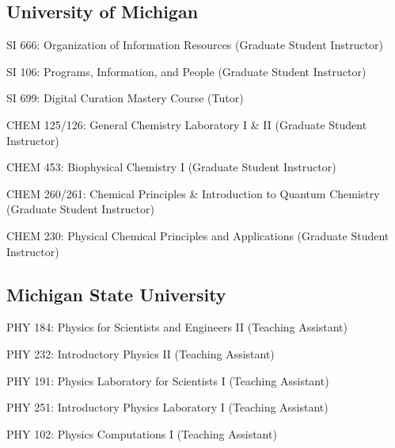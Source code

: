 \documentclass[12pt,letterpaper]{report}
\newcommand{\listitemspace}{0.25em}
\renewenvironment{itemize}
{\begin{list}{}{\setlength{\leftmargin}{0em}
            \setlength{\parskip}{0em}
            \setlength{\itemsep}{\listitemspace}
            \setlength{\parsep}{\listitemspace}}}
{\end{list}}
\begin{document}
\subsection*{University of Michigan}
    
\begin{itemize}
    	
    	\item SI 666: Organization of Information Resources (Graduate Student Instructor)
        
	\item SI 106: Programs, Information, and People (Graduate Student Instructor)
        
	\item SI 699: Digital Curation Mastery Course (Tutor)
        
	\item CHEM 125/126: General Chemistry Laboratory I \& II (Graduate Student Instructor)
        
	\item CHEM 453: Biophysical Chemistry I (Graduate Student Instructor)
        
	\item CHEM 260/261: Chemical Principles \& Introduction to Quantum Chemistry (Graduate Student Instructor)
        
	\item CHEM 230: Physical Chemical Principles and Applications (Graduate Student Instructor)
    
\end{itemize}
    	
\subsection*{Michigan State University}

\begin{itemize}

        \item PHY 184: Physics for Scientists and Engineers II (Teaching Assistant)
        
        \item PHY 232: Introductory Physics II (Teaching Assistant)
        
        \item PHY 191: Physics Laboratory for Scientists I (Teaching Assistant)
        
        \item PHY 251: Introductory Physics Laboratory I (Teaching Assistant)
        
        \item PHY 102: Physics Computations I (Teaching Assistant)

\end{itemize}
\end{document}

